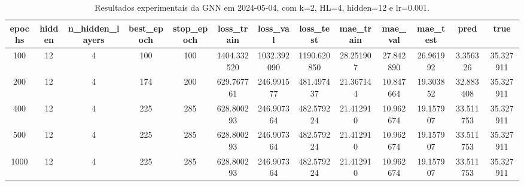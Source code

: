 \begin{table}[h]
\centering
\caption{Resultados experimentais da GNN em 2024-05-04, com k=2, HL=4, hidden=12 e lr=0.001.}
\label{tab:gnn_results_k2_hl4_h12_d20240504}
\begin{tabular}{ccccccccccccc}
\toprule
epochs & hidden & n\_hidden\_layers & best\_epoch & stop\_epoch & loss\_train & loss\_val & loss\_test & mae\_train & mae\_val & mae\_test & pred & true \\
\midrule
100 & 12 & 4 & 100 & 100 & 1404.332520 & 1032.392090 & 1190.620850 & 28.251907 & 27.842890 & 26.961992 & 3.356326 & 35.327911 \\
200 & 12 & 4 & 174 & 200 & 629.767761 & 246.991577 & 481.497437 & 21.367144 & 10.847664 & 19.303852 & 32.883408 & 35.327911 \\
400 & 12 & 4 & 225 & 285 & 628.800293 & 246.907364 & 482.579224 & 21.412910 & 10.962674 & 19.157907 & 33.511753 & 35.327911 \\
500 & 12 & 4 & 225 & 285 & 628.800293 & 246.907364 & 482.579224 & 21.412910 & 10.962674 & 19.157907 & 33.511753 & 35.327911 \\
1000 & 12 & 4 & 225 & 285 & 628.800293 & 246.907364 & 482.579224 & 21.412910 & 10.962674 & 19.157907 & 33.511753 & 35.327911 \\
\bottomrule
\end{tabular}
\end{table}
